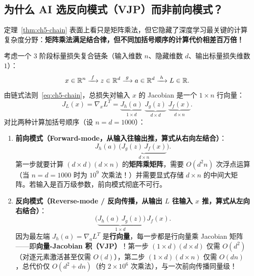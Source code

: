 \subsection{为什么 AI 选反向模式（VJP）而非前向模式？}

定理~\ref{thm:ch5-chain} 表面上看只是矩阵乘法，但它隐藏了深度学习最关键的计算复杂度分野：\textbf{矩阵乘法满足结合律，但不同加括号顺序的计算代价相差百万倍！}

考虑一个 3 阶段标量损失复合链条（输入维数 $n$、隐藏维数 $d$、输出标量损失维数 $1$）：
\[
  x \in \mathbb{R}^n \xrightarrow{\;f\;} z \in \mathbb{R}^d \xrightarrow{\;g\;} a \in \mathbb{R}^d \xrightarrow{\;h\;} L \in \mathbb{R}.
\]
由链式法则~\eqref{eq:ch5-chain}，总损失对输入 $x$ 的 Jacobian 是一个 $1\times n$ 行向量：
\[
  J_L(x) = \nabla_x L^T =
  \underbrace{J_h(a)}_{1\times d}\;
  \underbrace{J_g(z)}_{d\times d}\;
  \underbrace{J_f(x)}_{d\times n}.
\]
对比两种计算加括号顺序（设 $n = d = 1000$）：
\begin{enumerate}
  \item \textbf{前向模式（Forward-mode，从输入往输出推，算式从右向左结合）}：
  \[
    J_h(a)\,\Big(\underbrace{J_g(z)\,J_f(x)}_{d\times n}\Big).
  \]
  第一步就要计算 $(d\times d)(d\times n)$ 的\textbf{矩阵乘矩阵}，需要 $O(d^2 n)$ 次浮点运算（当 $n=d=1000$ 时为 $10^9$ 次乘法！）并需要显式存储 $d\times n$ 的中间大矩阵。若输入是百万级参数，前向模式彻底不可行。
  \item \textbf{反向模式（Reverse-mode / 反向传播，从输出 $L$ 往输入 $x$ 推，算式从左向右结合）}：
  \[
    \Big(\underbrace{J_h(a)\,J_g(z)}_{1\times d}\Big)\,J_f(x).
  \]
  因为最左端 $J_h(a) = \nabla_a L^T$ 是\textbf{行向量}，每一步都是行向量乘 Jacobian 矩阵——即\textbf{向量-Jacobian 积（VJP）}！第一步 $(1\times d)(d\times d)$ 仅需 $O(d^2)$（对逐元素激活甚至仅需 $O(d)$），第二步 $(1\times d)(d\times n)$ 仅需 $O(dn)$，总代价仅 $O(d^2 + dn)$（约 $2\times 10^6$ 次乘法），与一次前向传播同量级！
\end{enumerate}

